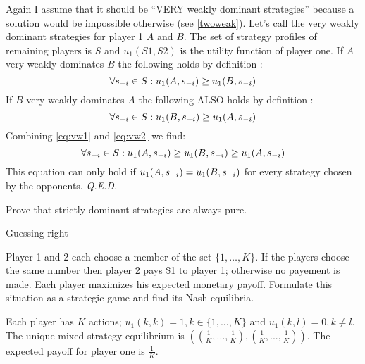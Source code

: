 \documentclass[../main.tex]{subfiles}
\begin{document}
\begin{solution}
	Again I assume that it should be ``VERY weakly dominant strategies'' because a solution would be impossible otherwise (see \autoref{twoweak}).
	Let's call the very weakly dominant strategies for player 1 $A$ and $B$.
	The set of strategy profiles of remaining players is $S$ and $u_1(S1,S2)$ is the utility function of player one.
	If $A$ very weakly dominates $B$ the following holds by definition :
	\begin{equation}
		\label{eq:vw1}
		\forall s_{\--i} \in S : u_1(A,s_{\--i}) \geq u_1(B,s_{\--i})
	\end{equation}
	If $B$ very weakly dominates $A$ the following ALSO holds by definition :
	\begin{equation}
		\label{eq:vw2}
		\forall s_{\--i} \in S : u_1(B,s_{\--i}) \geq u_1(A,s_{\--i})
	\end{equation}
	Combining \autoref{eq:vw1} and \autoref{eq:vw2} we find:
	\begin{equation}
		\forall s_{\--i} \in S : u_1(A,s_{\--i}) \geq u_1(B,s_{\--i}) \geq u_1(A,s_{\--i})
	\end{equation}
	This equation can only hold if $u_1(A,s_{\--i}) = u_1(B,s_{\--i})$ for every strategy chosen by the opponents. \textit{Q.E.D.}
\end{solution}

\begin{question}
	Prove that strictly dominant strategies are always pure. 
\end{question}

\begin{solution}

\end{solution}

\begin{question}
	Guessing right

	Player 1 and 2 each choose a member of the set $\{1,\ldots,K\}$. If the players choose the same number then player 2 pays \$1 to player 1; otherwise no payement is made. Each player maximizes his expected monetary payoff. Formulate this situation as a strategic game and find its Nash equilibria.
\end{question}

\begin{solution}
Each player has $K$ actions; $u_1(k,k) = 1, k \in \{1,..., K\}$ and $u_1(k, l) = 0, k \neq l$. The unique mixed strategy equilibrium is $((\frac{1}{K},...,\frac{1}{K}),(\frac{1}{K},...,\frac{1}{K}))$. The expected payoff for player one is $\frac{1}{K}$.

\end{solution}
\end{document}
